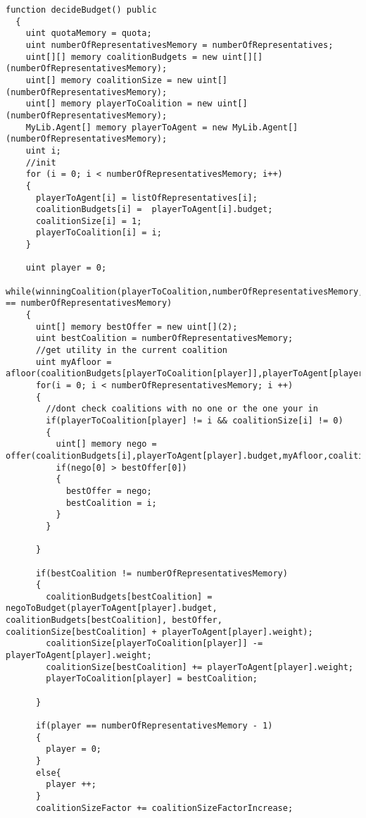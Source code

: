 \begin{lstlisting}
function decideBudget() public
  {
    uint quotaMemory = quota;
    uint numberOfRepresentativesMemory = numberOfRepresentatives;
    uint[][] memory coalitionBudgets = new uint[][](numberOfRepresentativesMemory);
    uint[] memory coalitionSize = new uint[](numberOfRepresentativesMemory);
    uint[] memory playerToCoalition = new uint[](numberOfRepresentativesMemory);
    MyLib.Agent[] memory playerToAgent = new MyLib.Agent[](numberOfRepresentativesMemory);
    uint i;
    //init
    for (i = 0; i < numberOfRepresentativesMemory; i++)
    {
      playerToAgent[i] = listOfRepresentatives[i];
      coalitionBudgets[i] =  playerToAgent[i].budget;
      coalitionSize[i] = 1;
      playerToCoalition[i] = i;
    }

    uint player = 0;
    while(winningCoalition(playerToCoalition,numberOfRepresentativesMemory,playerToAgent) == numberOfRepresentativesMemory)
    {
      uint[] memory bestOffer = new uint[](2);
      uint bestCoalition = numberOfRepresentativesMemory;
      //get utility in the current coalition
      uint myAfloor = afloor(coalitionBudgets[playerToCoalition[player]],playerToAgent[player].budget,coalitionSize[playerToCoalition[player]],quotaMemory);
      for(i = 0; i < numberOfRepresentativesMemory; i ++)
      {
        //dont check coalitions with no one or the one your in
        if(playerToCoalition[player] != i && coalitionSize[i] != 0)
        {
          uint[] memory nego = offer(coalitionBudgets[i],playerToAgent[player].budget,myAfloor,coalitionSize[i],playerToAgent[player].weight);
          if(nego[0] > bestOffer[0])
          {
            bestOffer = nego;
            bestCoalition = i;
          }
        }

      }

      if(bestCoalition != numberOfRepresentativesMemory)
      {
        coalitionBudgets[bestCoalition] = negoToBudget(playerToAgent[player].budget, coalitionBudgets[bestCoalition], bestOffer, coalitionSize[bestCoalition] + playerToAgent[player].weight);
        coalitionSize[playerToCoalition[player]] -= playerToAgent[player].weight;
        coalitionSize[bestCoalition] += playerToAgent[player].weight;
        playerToCoalition[player] = bestCoalition;

      }

      if(player == numberOfRepresentativesMemory - 1)
      {
        player = 0;
      }
      else{
        player ++;
      }
      coalitionSizeFactor += coalitionSizeFactorIncrease;


\end{lstlisting}

